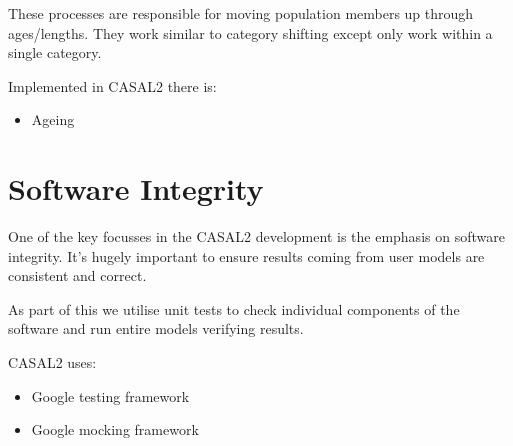 \documentclass[a4paper,11pt,twoside,pdftex,draft]{article}
\begin{document}
These processes are responsible for moving population members up through
ages/lengths. They work similar to category shifting except only work
within a single category.

Implemented in CASAL2 there is:

\begin{itemize}
\item
  Ageing
\end{itemize}

\hypertarget{software-integrity}{%
\section{Software Integrity}\label{software-integrity}}

One of the key focusses in the CASAL2 development is the emphasis on
software integrity. It's hugely important to ensure results coming from
user models are consistent and correct.

As part of this we utilise unit tests to check individual components of
the software and run entire models verifying results.

CASAL2 uses:

\begin{itemize}
\item
  Google testing framework
\item
  Google mocking framework
\end{itemize}
\end{document}
